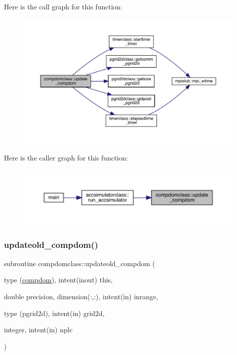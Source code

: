 Here is the call graph for this function\+:\nopagebreak
\begin{figure}[H]
\begin{center}
\leavevmode
\includegraphics[width=350pt]{namespacecompdomclass_a0e7d562b378f77e0d3a14b33168cb46b_cgraph}
\end{center}
\end{figure}
Here is the caller graph for this function\+:\nopagebreak
\begin{figure}[H]
\begin{center}
\leavevmode
\includegraphics[width=350pt]{namespacecompdomclass_a0e7d562b378f77e0d3a14b33168cb46b_icgraph}
\end{center}
\end{figure}
\mbox{\label{namespacecompdomclass_abf3eab7526c06e30b574ddf8be378826}} 
\subsubsection{\texorpdfstring{updateold\_compdom()}{updateold\_compdom()}}
{\footnotesize\ttfamily subroutine compdomclass\+::updateold\+\_\+compdom (\begin{DoxyParamCaption}\item[{type (\mbox{\hyperlink{namespacecompdomclass_structcompdomclass_1_1compdom}{compdom}}), intent(inout)}]{this,  }\item[{double precision, dimension(\+:,\+:), intent(in)}]{inrange,  }\item[{type (pgrid2d), intent(in)}]{grid2d,  }\item[{integer, intent(in)}]{nplc }\end{DoxyParamCaption})}



